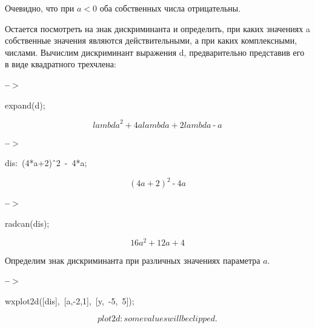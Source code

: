 \documentclass[fleqn, 14pt]{article}
\begin{document}
Очевидно, что при $a < 0$ оба собственных числа отрицательны.

Остается посмотреть
на знак дискриминанта и определить, при каких значениях a собственные
значения являются действительными, а при каких комплексными, числами.
Вычислим дискриминант выражения d, предварительно представив его в
виде квадратного трехчлена:

\noindent
\begin{minipage}[t]{4.000000em}\color{red}\bfseries
 --\ensuremath{\ensuremath{>}}	
\end{minipage}
\begin{minipage}[t]{\textwidth}\color{blue}
expand(d);
\end{minipage}
\[\displaystyle \tag{\% o41} 
{{lambda}^{2}}\operatorname{+}4 a lambda\operatorname{+}2 lambda\operatorname{-}a\mbox{}
\]


\noindent
\begin{minipage}[t]{4.000000em}\color{red}\bfseries
 --\ensuremath{\ensuremath{>}}	
\end{minipage}
\begin{minipage}[t]{\textwidth}\color{blue}
dis:\ (4*a+2)\^\ 2\ -\ 4*a;
\end{minipage}
\[\displaystyle \tag{dis} 
{{\left( 4 a\operatorname{+}2\right) }^{2}}\operatorname{-}4 a\mbox{}
\]


\noindent
\begin{minipage}[t]{4.000000em}\color{red}\bfseries
 --\ensuremath{\ensuremath{>}}	
\end{minipage}
\begin{minipage}[t]{\textwidth}\color{blue}
radcan(dis);
\end{minipage}
\[\displaystyle \tag{\% o43} 
16 {{a}^{2}}\operatorname{+}12 a\operatorname{+}4\mbox{}
\]

Определим знак дискриминанта при различных значениях параметра $a$.

\noindent
\begin{minipage}[t]{4.000000em}\color{red}\bfseries
 --\ensuremath{\ensuremath{>}}	
\end{minipage}
\begin{minipage}[t]{\textwidth}\color{blue}
wxplot2d([dis],\ [a,-2,1],\ [y,\ -5,\ 5]);
\end{minipage}
\[\displaystyle plot2d: some values will be clipped.
\mbox{}\]
\end{document}
